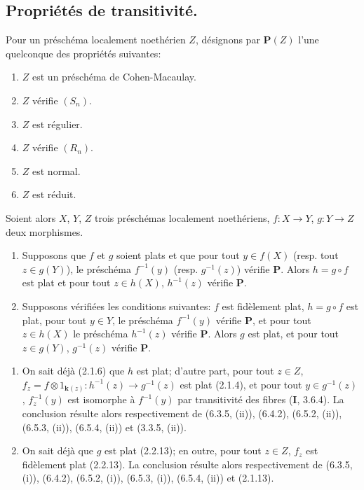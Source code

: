 
\subsection{Propriétés de transitivité.}

\begin{proposition}[6.6.1]
\label{IV.2.s6.6.1-fr}
Pour un préschéma localement noethérien $Z$, désignons par $\boldsymbol{P}(Z)$ l'une
quelconque des propriétés suivantes:
\begin{enumerate}
\item[\textup{a)}] $Z$ est un préschéma de Cohen-Macaulay.
\item[\textup{b)}] $Z$ vérifie $(S_n)$.
\item[\textup{c)}] $Z$ est régulier.
\item[\textup{d)}] $Z$ vérifie $(R_n)$.
\item[\textup{e)}] $Z$ est normal.
\item[\textup{f)}] $Z$ est réduit.
\end{enumerate}
Soient alors $X$, $Y$, $Z$ trois préschémas localement noethériens,
$f:X\to Y$, $g:Y\to Z$ deux morphismes.
\begin{enumerate}
\item[\textup{(i)}] Supposons que $f$ et $g$ soient plats et que pour tout
$y\in f(X)$ \textup{(resp.} tout $z\in g(Y)$), le préschéma $f^{-1}(y)$
\textup{(resp.} $g^{-1}(z)$) vérifie $\boldsymbol{P}$. Alors $h=g\circ f$ est plat et pour tout
$z\in h(X)$, $h^{-1}(z)$ vérifie $\boldsymbol{P}$.
\item[\textup{(ii)}] Supposons vérifiées les conditions suivantes: $f$ est
fidèlement plat, $h=g\circ f$ est plat, pour tout $y\in Y$, le
préschéma $f^{-1}(y)$ vérifie $\boldsymbol{P}$, et pour tout $z\in h(X)$ le
préschéma $h^{-1}(z)$ vérifie $\boldsymbol{P}$. Alors $g$ est plat, et pour tout
$z\in g(Y)$, $g^{-1}(z)$ vérifie $\boldsymbol{P}$.
\end{enumerate}
\end{proposition}

\begin{enumerate}
\item[(i)] On sait déjà (2.1.6) que $h$ est plat; d'autre part, pour
      tout $z\in Z$,
$f_z=f\otimes 1_{\mathbf{k}(z)}:h^{-1}(z)\longrightarrow g^{-1}(z)$ est plat (2.1.4), et pour tout $y\in g^{-1}(z)$, $f_z^{-1}(y)$ est
isomorphe à $f^{-1}(y)$ par transitivité des fibres (\textbf{I}, 3.6.4). La
conclusion résulte alors respectivement de (6.3.5, (ii)), (6.4.2),
(6.5.2, (ii)), (6.5.3, (ii)), (6.5.4, (ii)) et (3.3.5, (ii)).
\item[(ii)] On sait déjà que $g$ est plat (2.2.13); en outre, pour
      tout $z\in Z$, $f_z$ est fidèlement plat (2.2.13). La conclusion
      résulte alors respectivement de (6.3.5, (i)), (6.4.2),
(6.5.2, (i)), (6.5.3, (i)), (6.5.4, (ii)) et (2.1.13).
\end{enumerate}

